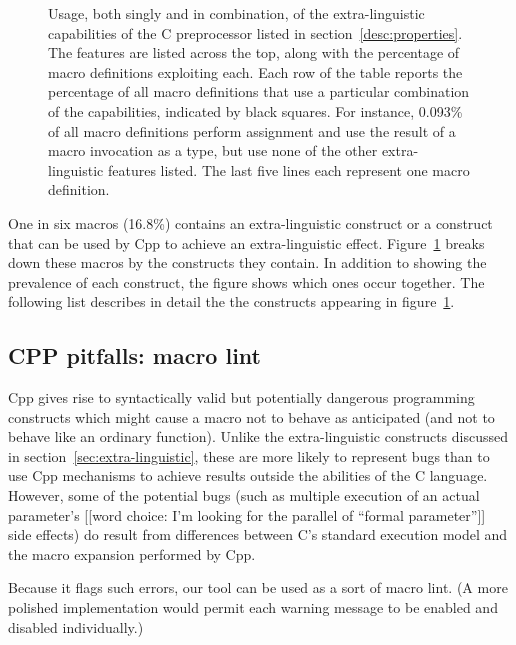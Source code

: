 \documentclass[10pt]{article}
\begin{document}
\begin{figure}
  {\small\centerline{}}
  
  \caption{Usage, both singly and in
    combination, of the extra-linguistic capabilities of the C
    preprocessor listed in section~\ref{desc:properties}.  The features are
    listed across the top, along with the percentage of macro definitions
    exploiting each.  Each row of the table reports the percentage of all
    macro definitions that use a particular combination of the
    capabilities, indicated by black squares.  For instance, 0.093\% of all
    macro definitions perform assignment and use the result of a macro
    invocation as a type, but use none of the other extra-linguistic
    features listed.  The last five lines each represent one macro
    definition.}
  \label{fig:subset-properties}
\end{figure}

One in six macros (16.8\%) contains an extra-linguistic construct or a
construct that can be used by Cpp to achieve an extra-linguistic effect.
Figure~\ref{fig:subset-properties} breaks down these macros by the
constructs they contain.  In addition to showing the prevalence of each
construct, the figure shows which ones occur together.  The following list
describes in detail the the constructs appearing in
figure~\ref{fig:subset-properties}.

{}



\subsection{CPP pitfalls:  macro lint}
\label{sec:lint}

Cpp gives rise to syntactically valid but potentially dangerous programming
constructs which might cause a macro not to behave as anticipated (and not
to behave like an ordinary function).  Unlike the extra-linguistic
constructs discussed in section~\ref{sec:extra-linguistic}, these are more
likely to represent bugs than to use Cpp mechanisms to achieve results
outside the abilities of the C language.  However, some of the potential
bugs (such as multiple execution of an actual parameter's [[word choice:
I'm looking for the parallel of ``formal parameter'']] side effects) do
result from differences between C's standard execution model and the
macro expansion performed by Cpp.

Because it flags such errors, our tool can be used as a sort of macro lint.
(A more polished implementation would permit each warning message to be
enabled and disabled individually.)
\end{document}
